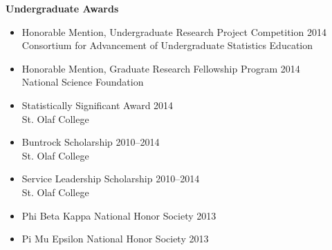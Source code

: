 \documentclass[margin]{res}
\begin{document}
\begin{resume}
\textbf{Undergraduate Awards}
\begin{itemize}
\item Honorable Mention, Undergraduate Research Project Competition \hfill 2014  \\
Consortium for Advancement of Undergraduate Statistics Education
\item Honorable Mention, Graduate Research Fellowship Program  \hfill 2014 \\
National Science Foundation
\item Statistically Significant Award \hfill 2014 \\
St. Olaf College
\item Buntrock Scholarship \hfill 2010--2014 \\
St. Olaf College 
\item Service Leadership Scholarship \hfill 2010--2014 \\
St. Olaf College 
\item Phi Beta Kappa National Honor Society \hfill 2013 
\item Pi Mu Epsilon National Honor Society \hfill 2013 \\
\end{itemize}



\end{resume}
\end{document}
